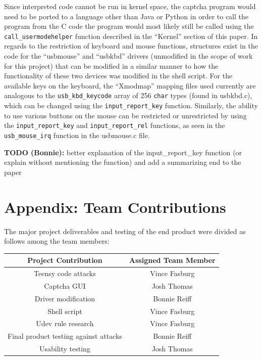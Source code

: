 \documentclass[pagenumbers]{ieee}
\begin{document}
Since interpreted code cannot be run in kernel space, the captcha program would need to be ported to a language other than Java or Python in order to call the program from the C code \textemdash the program would most likely still be called using the \texttt{call\_usermodehelper} function described in the ``Kernel'' section of this paper. In regards to the restriction of keyboard and mouse functions, structures exist in the code for the ``usbmouse'' and ``usbkbd'' drivers (unmodified in the scope of work for this project) that can be modified in a similar manner to how the functionality of these two devices was modified in the shell script. For the available keys on the keyboard, the ``Xmodmap'' mapping files used currently are analogous to the \texttt{usb\_kbd\_keycode} array of 256 \texttt{char} types (found in usbkbd.c), which can be changed using the \texttt{input\_report\_key} function. Similarly, the ability to use various buttons on the mouse can be restricted or unrestricted by using the \texttt{input\_report\_key} and \texttt{input\_report\_rel} functions, as seen in the \texttt{usb\_mouse\_irq} function in the usbmouse.c file.

\textbf{TODO (Bonnie):}  better explanation of the input\_report\_key function (or explain without mentioning the function) and add a summarizing end to the paper


\appendix 


\section{Appendix: Team Contributions}

The major project deliverables and testing of the end product were divided as follows among the team members:

\begin{center}
	\begin{tabular}{ | c | c | }
		\hline \textbf{Project Contribution} & \textbf{Assigned Team Member} \\ \hline
		Teensy code attacks & Vince Fasburg \\ \hline
		Captcha GUI & Josh Thomas \\ \hline
		Driver modification & Bonnie Reiff \\ \hline
		Shell script & Vince Fasburg \\ \hline
		Udev rule research & Vince Fasburg \\ \hline
		Final product testing against attacks & Bonnie Reiff \\ \hline
		Usability testing & Josh Thomas \\ \hline
	\end{tabular}
\end{center}
\end{document}
